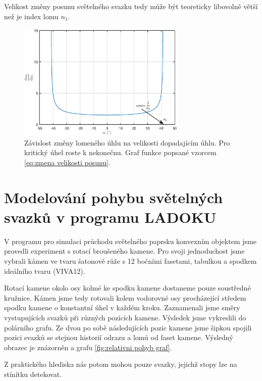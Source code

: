 Velikost změny posunu světelného svazku tedy může být teoreticky libovolně větší než je index lomu $n_1$. 

\begin{figure}[h!]
\begin{center}
\includegraphics[width = 8cm]{figures/derivace.eps}
\end{center}
\caption{Závislost změny lomeného úhlu na velikosti dopadajícím úhlu. Pro kritický úhel roste k nekonečnu. Graf funkce popsané vzorcem \ref{eq:zmena velikosti posunu}.}
\label{fig:derivace uhlu}
\end{figure}
\newpage


\section{Modelování pohybu světelných svazků v programu LADOKU}

V programu pro simulaci průchodu světelného paprsku konvexním objektem jsme provedli experiment s rotací broušeného kamene. Pro svoji jednoduchost jsme vybrali kámen ve tvaru šatonové růže s 12 bočními fasetami, tabulkou a spodkem ideálního tvaru (VIVA12).

Rotací kamene okolo osy kolmé ke spodku kamene dostaneme pouze soustředné kružnice. Kámen jsme tedy rotovali kolem vodorovné osy procházející středem spodku kamene o konstantní úhel v každém kroku. Zaznamenali jsme směry vystupujících svazků při různých pozicích kamene. Výsledek jsme vykreslili do polárního grafu. Ze dvou po sobě následujících pozic kamene jsme šipkou spojili pozici svazků se stejnou historií odrazu a lomů od faset kamene. Výsledný obrazec je znázorněn a grafu \ref{fig:relativni pohyb graf}.

Z praktického hlediska nás potom mohou pouze svazky, jejichž stopy lze na stínítku detekovat.

